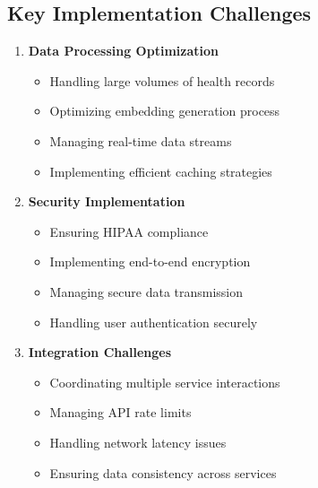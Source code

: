 \subsection{Key Implementation Challenges}

\begin{enumerate}
    \item \textbf{Data Processing Optimization}
    \begin{itemize}
        \item Handling large volumes of health records
        \item Optimizing embedding generation process
        \item Managing real-time data streams
        \item Implementing efficient caching strategies
    \end{itemize}

    \item \textbf{Security Implementation}
    \begin{itemize}
        \item Ensuring HIPAA compliance
        \item Implementing end-to-end encryption
        \item Managing secure data transmission
        \item Handling user authentication securely
    \end{itemize}

    \item \textbf{Integration Challenges}
    \begin{itemize}
        \item Coordinating multiple service interactions
        \item Managing API rate limits
        \item Handling network latency issues
        \item Ensuring data consistency across services
    \end{itemize}
\end{enumerate} 